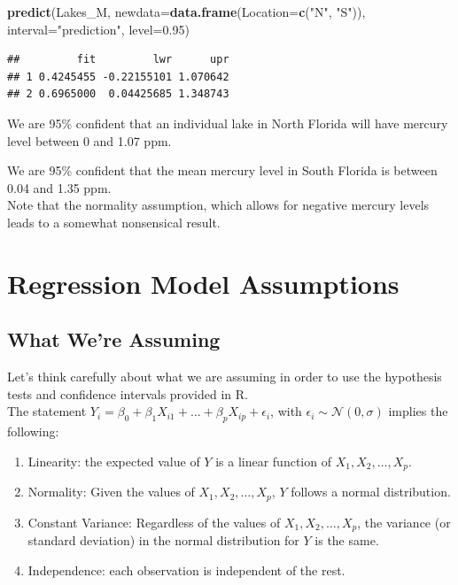 \documentclass[]{book}
\newenvironment{Shaded}{\begin{snugshade}}{\end{snugshade}}
\newcommand{\KeywordTok}[1]{\textcolor[rgb]{0.13,0.29,0.53}{\textbf{#1}}}
\newcommand{\DataTypeTok}[1]{\textcolor[rgb]{0.13,0.29,0.53}{#1}}
\newcommand{\FloatTok}[1]{\textcolor[rgb]{0.00,0.00,0.81}{#1}}
\newcommand{\StringTok}[1]{\textcolor[rgb]{0.31,0.60,0.02}{#1}}
\newcommand{\NormalTok}[1]{#1}
\begin{document}
\begin{Shaded}
\begin{Highlighting}[]
\KeywordTok{predict}\NormalTok{(Lakes_M, }\DataTypeTok{newdata=}\KeywordTok{data.frame}\NormalTok{(}\DataTypeTok{Location=}\KeywordTok{c}\NormalTok{(}\StringTok{"N"}\NormalTok{, }\StringTok{"S"}\NormalTok{)), }\DataTypeTok{interval=}\StringTok{"prediction"}\NormalTok{, }\DataTypeTok{level=}\FloatTok{0.95}\NormalTok{)}
\end{Highlighting}
\end{Shaded}

\begin{verbatim}
##         fit         lwr      upr
## 1 0.4245455 -0.22155101 1.070642
## 2 0.6965000  0.04425685 1.348743
\end{verbatim}

We are 95\% confident that an individual lake in North Florida will have
mercury level between 0 and 1.07 ppm.

We are 95\% confident that the mean mercury level in South Florida is
between 0.04 and 1.35 ppm.\\
Note that the normality assumption, which allows for negative mercury
levels leads to a somewhat nonsensical result.

\section{Regression Model
Assumptions}\label{regression-model-assumptions}

\subsection{What We're Assuming}\label{what-were-assuming}

Let's think carefully about what we are assuming in order to use the
hypothesis tests and confidence intervals provided in R.\\
The statement
\(Y_i = \beta_0 + \beta_1X_{i1}+ \ldots + \beta_pX_{ip} + \epsilon_i\),
with \(\epsilon_i\sim\mathcal{N}(0,\sigma)\) implies the following:

\begin{enumerate}
\def\labelenumi{\arabic{enumi}.}
\item
  Linearity: the expected value of \(Y\) is a linear function of
  \(X_1, X_2, \ldots, X_p\).
\item
  Normality: Given the values of \(X_1, X_2, \ldots, X_p\), \(Y\)
  follows a normal distribution.
\item
  Constant Variance: Regardless of the values of
  \(X_1, X_2, \ldots, X_p\), the variance (or standard deviation) in the
  normal distribution for \(Y\) is the same.
\item
  Independence: each observation is independent of the rest.
\end{enumerate}
\end{document}
